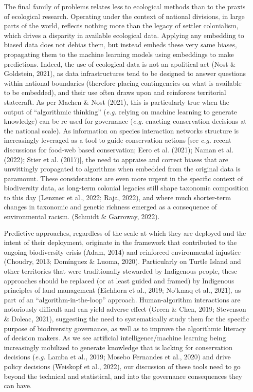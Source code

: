 \documentclass[10pt,oneside]{article}
\begin{document}
The final family of problems relates less to ecological methods than to
the praxis of ecological research. Operating under the context of
national divisions, in large parts of the world, reflects nothing more
than the legacy of settler colonialism, which drives a disparity in
available ecological data. Applying any embedding to biased data does
not debias them, but instead embeds these very same biases, propagating
them to the machine learning models using embeddings to make
predictions. Indeed, the use of ecological data is not an apolitical act
(Nost \& Goldstein, 2021), as data infrastructures tend to be designed
to answer questions within national boundaries (therefore placing
contingencies on what is available to be embedded), and their use often
draws upon and reinforces territorial statecraft. As per Machen \& Nost
(2021), this is particularly true when the output of ``algorithmic
thinking'' (\emph{e.g.} relying on machine learning to generate
knowledge) can be re-used for governance (\emph{e.g.} enacting
conservation decisions at the national scale). As information on species
interaction networks structure is increasingly leveraged as a tool to
guide conservation actions {[}see \emph{e.g.} recent discussions for
food-web based conservation; Eero et al. (2021); Naman et al. (2022);
Stier et al. (2017){]}, the need to appraise and correct biases that are
unwittingly propagated to algorithms when embedded from the original
data is paramount. These considerations are even more urgent in the
specific context of biodiversity data, as long-term colonial legacies
still shape taxonomic composition to this day (Lenzner et al., 2022;
Raja, 2022), and where much shorter-term changes in taxonomic and
genetic richness emerged as a consequence of environmental racism.
(Schmidt \& Garroway, 2022).

Predictive approaches, regardless of the scale at which they are
deployed and the intent of their deployment, originate in the framework
that contributed to the ongoing biodiversity crisis (Adam, 2014) and
reinforced environmental injustice (Choudry, 2013; Domínguez \& Luoma,
2020). Particularly on Turtle Island and other territories that were
traditionally stewarded by Indigenous people, these approaches should be
replaced (or at least guided and framed) by Indigenous principles of
land management (Eichhorn et al., 2019; No'kmaq et al., 2021), as part
of an ``algorithm-in-the-loop'' approach. Human-algorithm interactions
are notoriously difficult and can yield adverse effect (Green \& Chen,
2019; Stevenson \& Doleac, 2021), suggesting the need to systematically
study them for the specific purpose of biodiversity governance, as well
as to improve the algorithmic literacy of decision makers. As we see
artificial intelligence/machine learning being increasingly mobilized to
generate knowledge that is lacking for conservation decisions
(\emph{e.g.} Lamba et al., 2019; Mosebo Fernandes et al., 2020) and
drive policy decisions (Weiskopf et al., 2022), our discussion of these
tools need to go beyond the technical and statistical, and into the
governance consequences they can have.
\end{document}
